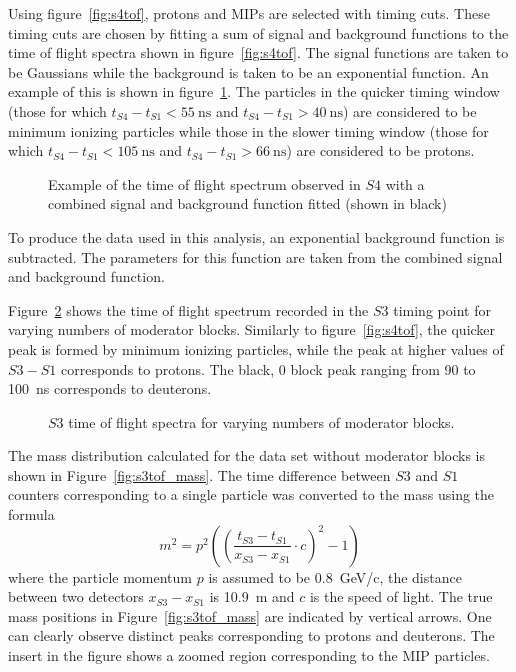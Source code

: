	Using figure~\ref{fig:s4tof}, protons and MIPs are selected with timing cuts. 
	These timing cuts are chosen by fitting a sum of signal and background functions to the time of flight spectra shown in figure~\ref{fig:s4tof}. 
	The signal functions are taken to be Gaussians while the background is taken to be an exponential function. 
	An example of this is shown in figure~\ref{fig:fitEx}.
	The particles in the quicker timing window (those for which $t_{S4}-t_{S1}<55~\text{ns}$ and $t_{S4}-t_{S1}>40~\text{ns}$) are considered to be minimum ionizing particles while those in the slower timing window (those for which $t_{S4}-t_{S1}<105~\text{ns}$ and $t_{S4}-t_{S1}>66~\text{ns}$) are considered to be protons.
	
	\begin{figure}[h]
		\begin{adjustbox}{max totalsize={.7\textwidth}{.62\textheight},center}
			
		\end{adjustbox}
		\caption{Example of the time of flight spectrum observed in $S4$ with a combined signal and background function fitted (shown in black)}
		\label{fig:fitEx}
	\end{figure}

	To produce the data used in this analysis, an exponential background function is subtracted. 
	The parameters for this function are taken from the combined signal and background function.

	Figure~\ref{fig:s3tof} shows the time of flight spectrum recorded in the $S3$ timing point for varying numbers of moderator blocks.
	Similarly to figure~\ref{fig:s4tof}, the quicker peak is formed by minimum ionizing particles, while the peak at higher values of $S3 - S1$ corresponds to protons.
	The black, 0 block peak ranging from 90 to 100~ns corresponds to deuterons.
	\begin{figure}[h]
		\begin{adjustbox}{max totalsize={.8\textwidth}{.5\textheight},center}
			
		\end{adjustbox}
		\caption{$S3$ time of flight spectra for varying numbers of moderator blocks.}
		\label{fig:s3tof}
	\end{figure}


    The mass distribution calculated for the data set without moderator blocks is shown in Figure~\ref{fig:s3tof_mass}. The time difference between $S3$ and $S1$ counters corresponding to a single particle was converted to the mass using the formula
    \begin{equation} 
     m^2 = p^2 \left( 
     \left(\frac{t_{S3}-t_{S1}}{x_{S3}-x_{S1}} \cdot c \right)^2
    - 1  \right)
    \end{equation}
    where the particle momentum $p$ is assumed to be 0.8~GeV/c, the distance between two detectors $x_{S3}-x_{S1}$ is 10.9~m and $c$ is the speed of light. 
    The true mass positions in Figure~\ref{fig:s3tof_mass} are indicated by vertical arrows. One can clearly observe distinct peaks corresponding to protons and deuterons. 
    The insert in the figure shows a zoomed region corresponding to the MIP particles. 
    

